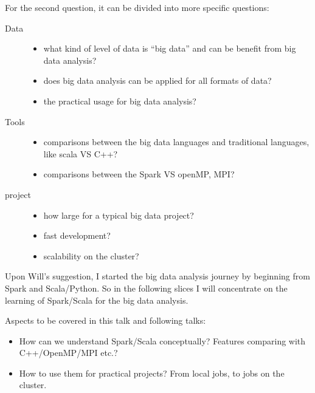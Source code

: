 \documentclass[notheorems, aspectratio=54]{beamer}
\begin{document}
\begin{frame}

For the second question, it can be divided into more specific questions:

\begin{description}
 \item [Data]
 \begin{itemize}
  \item what kind of level of data is ``big data'' and can be benefit from big data analysis?
  \item does big data analysis can be applied for all formats of data?
  \item the practical usage for big data analysis?
 \end{itemize}
  \item [Tools]
 \begin{itemize}
  \item comparisons between the big data languages and traditional languages, like scala VS C++?
  \item comparisons between the Spark VS openMP, MPI?  
 \end{itemize}
  \item [project]
 \begin{itemize}
  \item how large for a typical big data project?
  \item fast development?
  \item scalability on the cluster?
 \end{itemize}
\end{description} 

\end{frame}


\begin{frame}

Upon Will's suggestion, I started the big data analysis journey by beginning from Spark and Scala/Python.
So in the following slices I will concentrate on the learning of Spark/Scala for the big data analysis.

Aspects to be covered in this talk and following talks: 
\begin{itemize}
 \item How can we understand Spark/Scala conceptually? Features comparing with C++/OpenMP/MPI etc.?
 \item How to use them for practical projects? From local jobs, to jobs on the cluster.
\end{itemize}


\end{frame}
\end{document}
